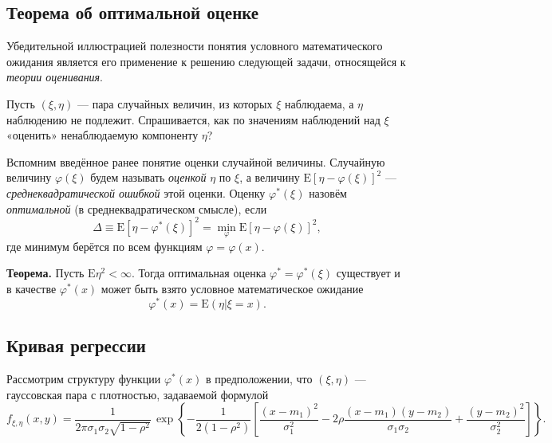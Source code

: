 \documentclass[11pt,a4paper]{article}
\begin{document}
    \hypertarget{ux442ux435ux43eux440ux435ux43cux430-ux43eux431-ux43eux43fux442ux438ux43cux430ux43bux44cux43dux43eux439-ux43eux446ux435ux43dux43aux435}{%
\subsection{Теорема об оптимальной
оценке}\label{ux442ux435ux43eux440ux435ux43cux430-ux43eux431-ux43eux43fux442ux438ux43cux430ux43bux44cux43dux43eux439-ux43eux446ux435ux43dux43aux435}}

Убедительной иллюстрацией полезности понятия условного математического
ожидания является его применение к решению следующей задачи, относящейся
к \emph{теории оценивания}.

Пусть \((\xi, \eta)\) --- пара случайных величин, из которых \(\xi\)
наблюдаема, а \(\eta\) наблюдению не подлежит. Спрашивается, как по
значениям наблюдений над \(\xi\) «оценить» ненаблюдаемую компоненту
\(\eta\)?

Вспомним введённое ранее понятие оценки случайной величины. Случайную
величину \(\varphi(\xi)\) будем называть \emph{оценкой} \(\eta\) по
\(\xi\), а величину \(\mathrm{E}\left[\eta-\varphi(\xi)\right]^2\) ---
\emph{среднеквадратической ошибкой} этой оценки. Оценку
\(\varphi^\ast(\xi)\) назовём \emph{оптимальной} (в среднеквадратическом
смысле), если \[
  \Delta \equiv \mathrm{E}\left[\eta-\varphi^\ast(\xi)\right]^2 = \min_\varphi \mathrm{E}\left[\eta-\varphi(\xi)\right]^2,
\] где минимум берётся по всем функциям \(\varphi=\varphi(x)\).

\textbf{Теорема.} Пусть \(\mathrm{E}\eta^2 < \infty\). Тогда оптимальная
оценка \(\varphi^\ast = \varphi^\ast(\xi)\) существует и в качестве
\(\varphi^\ast(x)\) может быть взято условное математическое ожидание
\[ \varphi^\ast(x) = \mathrm{E}(\eta|\xi = x). \]

    \hypertarget{ux43aux440ux438ux432ux430ux44f-ux440ux435ux433ux440ux435ux441ux441ux438ux438}{%
\subsection{Кривая
регрессии}\label{ux43aux440ux438ux432ux430ux44f-ux440ux435ux433ux440ux435ux441ux441ux438ux438}}

Рассмотрим структуру функции \(\varphi^\ast(x)\) в предположении, что
\((\xi, \eta)\) --- гауссовская пара с плотностью, задаваемой формулой
\[
  f_{\xi,\eta}(x, y) = \frac{1}{2\pi\sigma_1\sigma_2\sqrt{1-\rho^2}} \, \exp\left\{-\frac{1}{2(1-\rho^2)} \left[ \frac{(x-m_1)^2}{\sigma_1^2} - 2\rho\frac{(x-m_1)(y-m_2)}{\sigma_1\sigma_2} + \frac{(y-m_2)^2}{\sigma_2^2} \right]\right\}.
\]
\end{document}
